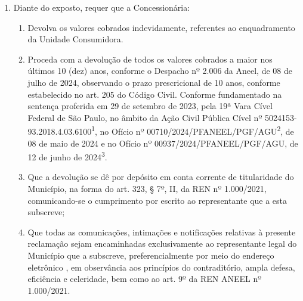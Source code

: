 \begin{enumerate}[resume]
\item 
Diante do exposto, requer que a Concessionária:

    \begin{enumerate}
        \item Devolva os valores cobrados indevidamente, referentes ao enquadramento da Unidade Consumidora.

        \item Proceda com a devolução de todos os valores cobrados a maior nos últimos 10 (dez) anos, conforme o Despacho nº 2.006 da Aneel, de 08 de julho de 2024, observando o prazo prescricional de 10 anos, conforme estabelecido no art. 205 do Código Civil. Conforme fundamentado na sentença proferida em 29 de setembro de 2023, pela 19ª Vara Cível Federal de São Paulo, no âmbito da Ação Civil Pública Cível nº 5024153-93.2018.4.03.6100\textsuperscript{1}, no Ofício nº 00710/2024/PFANEEL/PGF/AGU\textsuperscript{2}, de 08 de maio de 2024 e no Ofício nº 00937/2024/PFANEEL/PGF/AGU, de 12 de junho de 2024\textsuperscript{3}.

        \item Que a devolução se dê por depósito em conta corrente de titularidade do Município, na forma do art. 323, § 7º, II, da REN nº 1.000/2021, comunicando-se o cumprimento por escrito ao representante que a esta subscreve;

        \item Que todas as comunicações, intimações e notificações relativas à presente reclamação sejam encaminhadas exclusivamente ao representante legal do Município que a subscreve, preferencialmente por meio do endereço eletrônico \emailEmpresa{}, em observância aos princípios do contraditório, ampla defesa, eficiência e celeridade, bem como ao art. 9º da REN ANEEL nº 1.000/2021.
    \end{enumerate}

\end{enumerate}